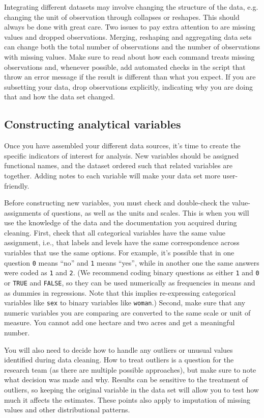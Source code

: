 Integrating different datasets may involve changing the structure of the data,
e.g. changing the unit of observation through collapses or reshapes.
This should always be done with great care. 
Two issues to pay extra attention to are missing values and dropped observations.
Merging, reshaping and aggregating data sets can change both the total number of observations
and the number of observations with missing values.
Make sure to read about how each command treats missing observations and,
whenever possible, add automated checks in the script that throw an error message if the result is different than what you expect.
If you are subsetting your data,
drop observations explicitly,
indicating why you are doing that and how the data set changed.

\subsection{Constructing analytical variables}
Once you have assembled your different data sources, 
it's time to create the specific indicators of interest for analysis. 
New variables should be assigned functional names, 
and the dataset ordered such that related variables are together.
Adding notes to each variable will make your data set more user-friendly.

Before constructing new variables,
you must check and double-check the value-assignments of questions,
as well as the units and scales.
This is when you will use the knowledge of the data and the documentation you acquired during cleaning.
First, check that all categorical variables have the same value assignment, i.e.,
that labels and levels have the same correspondence across variables that use the same options.
For example, it's possible that in one question \texttt{0} means ``no'' and \texttt{1} means ``yes'',
while in another one the same answers were coded as \texttt{1} and \texttt{2}.
(We recommend coding binary questions as either \texttt{1} and \texttt{0} or \texttt{TRUE} and \texttt{FALSE},
so they can be used numerically as frequencies in means and as dummies in regressions.
Note that this implies re-expressing categorical variables like \texttt{sex} to binary variables like \texttt{woman}.)
Second, make sure that any numeric variables you are comparing are converted to the same scale or unit of measure.
You cannot add one hectare and two acres and get a meaningful number.

You will also need to decide how to handle any outliers or unusual values identified during data cleaning. 
How to treat outliers is a question for the research team (as there are multiple possible approaches),
but make sure to note what decision was made and why.
Results can be sensitive to the treatment of outliers,
so keeping the original variable in the data set will allow you to test how much it affects the estimates.
These points also apply to imputation of missing values and other distributional patterns.

